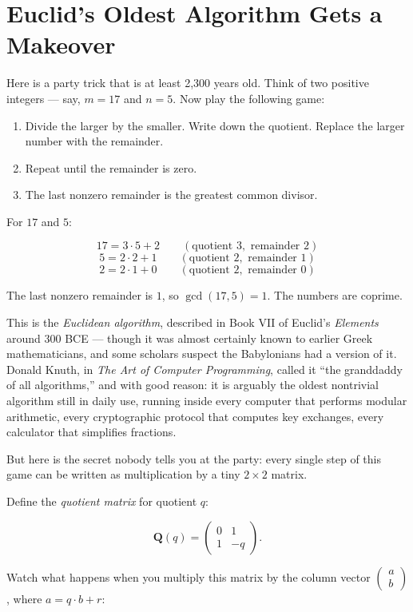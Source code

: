 \section{Euclid's Oldest Algorithm Gets a Makeover}
Here is a party trick that is at least 2,300 years old. Think of two positive integers --- say, \(m = 17\) and \(n = 5\). Now play the following game:

\begin{enumerate}
\def\labelenumi{\arabic{enumi}.}
\tightlist
\item
  Divide the larger by the smaller. Write down the quotient. Replace the larger number with the remainder.
\item
  Repeat until the remainder is zero.
\item
  The last nonzero remainder is the greatest common divisor.
\end{enumerate}

For \(17\) and \(5\):

\[
17 = 3 \cdot 5 + 2 \qquad (\text{quotient } 3, \text{ remainder } 2)
\] \[
5 = 2 \cdot 2 + 1 \qquad (\text{quotient } 2, \text{ remainder } 1)
\] \[
2 = 2 \cdot 1 + 0 \qquad (\text{quotient } 2, \text{ remainder } 0)
\]

The last nonzero remainder is \(1\), so \(\gcd(17, 5) = 1\). The numbers are coprime.

This is the \emph{Euclidean algorithm}, described in Book VII of Euclid's \emph{Elements} around 300 BCE --- though it was almost certainly known to earlier Greek mathematicians, and some scholars suspect the Babylonians had a version of it. Donald Knuth, in \emph{The Art of Computer Programming}, called it ``the granddaddy of all algorithms,'' and with good reason: it is arguably the oldest nontrivial algorithm still in daily use, running inside every computer that performs modular arithmetic, every cryptographic protocol that computes key exchanges, every calculator that simplifies fractions.

But here is the secret nobody tells you at the party: every single step of this game can be written as multiplication by a tiny \(2 \times 2\) matrix.

Define the \emph{quotient matrix} for quotient \(q\):

\[
\mathbf{Q}(q) = \begin{pmatrix} 0 & 1 \\ 1 & -q \end{pmatrix}.
\]

Watch what happens when you multiply this matrix by the column vector \(\begin{pmatrix} a \\ b \end{pmatrix}\), where \(a = q \cdot b + r\):

